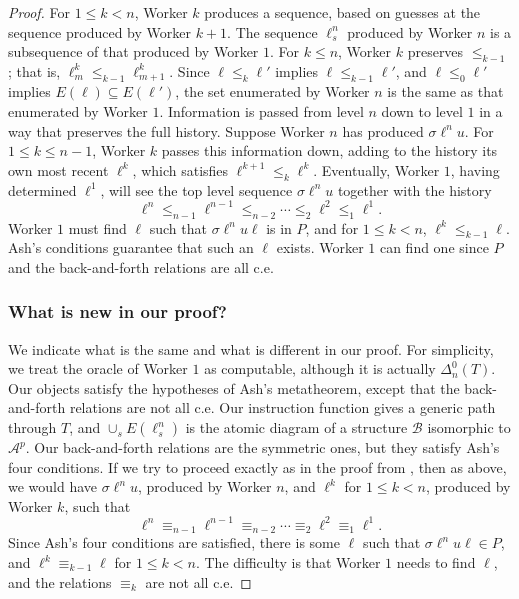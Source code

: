 \documentclass[10pt,a4paper]{article}
\theoremstyle{definition}
\begin{document}
\begin{proof}
		For $1\leq k < n$, Worker $k$ produces a sequence, based on guesses at the sequence produced by Worker $k+1$. The sequence $\ell^n_s$ produced by Worker $n$ is a subsequence of that produced by Worker $1$. For $k\leq n$, Worker $k$ preserves $\leq_{k-1}$; that is, $\ell^k_m\leq_{k-1}\ell^k_{m+1}$. Since $\ell\leq_k\ell'$ implies $\ell\leq_{k-1}\ell'$, and $\ell\leq_0\ell'$ implies $E(\ell)\subseteq E(\ell')$, the set enumerated by Worker $n$ is the same as that enumerated by Worker $1$. Information is passed from level $n$ down to level $1$ in a way that preserves the full history. Suppose Worker $n$ has produced $\sigma\ell^nu$. For $1\leq k\leq n-1$, Worker $k$ passes this information down, adding to the history its own most recent $\ell^k$, which satisfies $\ell^{k+1}\leq_k\ell^k$. Eventually, Worker $1$, having determined $\ell^1$, will see the top level sequence $\sigma\ell^nu$ together with the history 
		\[ \ell^n \leq_{n-1} \ell^{n-1} \leq_{n-2} \cdots \leq_2 \ell^2 \leq_1 \ell^1.\]
		Worker $1$ must find $\ell$ such that $\sigma\ell^nu\ell$ is in $P$, and for $1\leq k < n$, $\ell^k \leq_{k-1} \ell$. Ash's conditions guarantee that such an $\ell$ exists. Worker $1$ can find one since $P$ and the back-and-forth relations are all c.e. 
		
		\subsubsection{What is new in our proof?}
		
		We indicate what is the same and what is different in our proof. For simplicity, we treat the oracle of Worker $1$ as computable, although it is actually $\Delta^0_n(T)$. Our objects satisfy the hypotheses of Ash's metatheorem, except that the back-and-forth relations are not all c.e. Our instruction function gives a generic path through $T$, and $\cup_s E(\ell^n_s)$ is the atomic diagram of a structure $\mathcal{B}$ isomorphic to $\mathcal{A}^p$. Our back-and-forth relations are the symmetric ones, but they satisfy Ash's four conditions. If we try to proceed exactly as in the proof from \cite{AK00}, then as above, we would have $\sigma\ell^n u$, produced by Worker $n$, and $\ell^k$ for $1\leq k < n$, produced by Worker $k$, such that 
		\[ \ell^n \equiv_{n-1} \ell^{n-1} \equiv_{n-2} \cdots \equiv_2 \ell^2 \equiv_1 \ell^1.\]
		Since Ash's four conditions are satisfied, there is some $\ell$ such that $\sigma\ell^nu\ell\in P$, and $\ell^k \equiv_{k-1} \ell$ for $1\leq k<n$. The difficulty is that Worker $1$ needs to find $\ell$, and the relations $\equiv_k$ are not all c.e. 
		

\end{proof}
\end{document}

